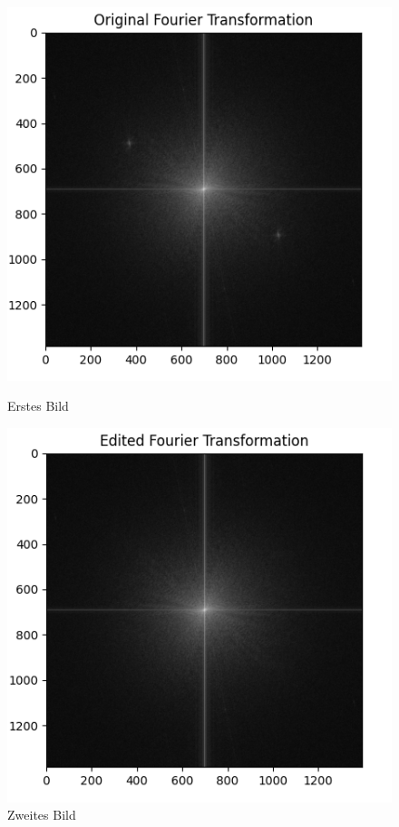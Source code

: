\documentclass[a4paper,12pt]{article}
\theoremstyle{definition}
\theoremstyle{remark}
\begin{document}
\begin{figure}[H]
  \centering
  \begin{minipage}{0.49\textwidth}
    \centering
    \includegraphics[width=\linewidth]{Bilder/fft_original.png}
    \caption{Erstes Bild}
    \label{fig:bild1}
  \end{minipage}
  \hfill
  \begin{minipage}{0.49\textwidth}
    \centering
    \includegraphics[width=\linewidth]{Bilder/fft_edited.png}
    \caption{Zweites Bild}
    \label{fig:bild2}
  \end{minipage}
\end{figure}
\end{document}

